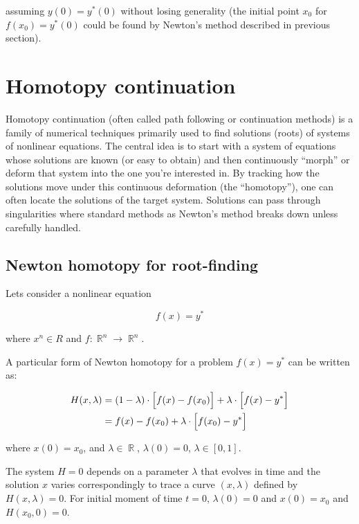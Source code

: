 \documentclass[11pt,american]{article}
\DeclareMathOperator{\R}{\mathbb{R}}
\begin{document}
assuming $y(0) = y^*(0)$ without losing generality (the initial point $x_0$ for $f(x_0) = y^*(0)$ could be found by Newton's method described in previous section).


\section{Homotopy continuation}

Homotopy continuation (often called path following or continuation methods) is a family of numerical techniques primarily used to find solutions (roots) of systems of nonlinear equations. The central idea is to start with a system of equations whose solutions are known (or easy to obtain) and then continuously “morph” or deform that system into the one you’re interested in. By tracking how the solutions move under this continuous deformation (the “homotopy”), one can often locate the solutions of the target system.
Solutions can pass through singularities where standard methods as Newton's method breaks down unless carefully handled.

\subsection{Newton homotopy for root-finding}

Lets consider a nonlinear equation 

\begin{equation}
f(x) = y^*
\end{equation}

where $x^n \in R$ and $f: \R^n \to \R^n$.

A particular form of Newton homotopy for a problem $f(x) = y^*$ can be written as:

\begin{align}\label{hom_func}
H(x,\lambda) &= (1 - \lambda) \cdot \Bigl[ f(x) - f(x_0) \Bigr] + \lambda \cdot \Bigl[ f(x) - y^* \Bigr] \\
&= f(x) - f(x_0) + \lambda \cdot \Bigl[ f(x_0) - y^* \Bigr] 
\end{align}

where $x(0) = x_0$, and $\lambda \in \R$, $\lambda(0) = 0$, $\lambda \in [0,1]$.

The system $H = 0$ depends on a parameter $\lambda$ that evolves in time and the solution $x$ varies correspondingly to trace a curve $(x, \lambda)$ defined by $H(x, \lambda) = 0$.
For initial moment of time $t = 0$, $\lambda(0) = 0$ and $x(0) = x_0$ and $H(x_0,0) = 0$.
\end{document}

